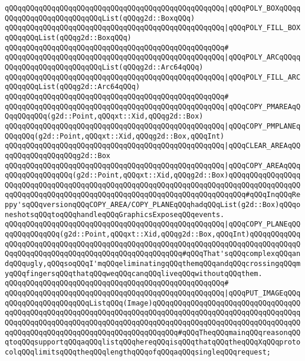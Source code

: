\verb|qQQqqQQqqQQqqQQqqQQqqQQqqQQqqQQqqQQqqQQqqQQqqQQqqQQq|\verb#|qQQqPOLY_BOXqQQqqQQqqQQqqQQqqQQqqQQqqQQqList(qQQqg2d::BoxqQQq)#\newline
\verb|qQQqqQQqqQQqqQQqqQQqqQQqqQQqqQQqqQQqqQQqqQQqqQQqqQQq|\verb#|qQQqPOLY_FILL_BOXqQQqqQQqList(qQQqg2d::BoxqQQq)#\newline
\verb|qQQqqQQqqQQqqQQqqQQqqQQqqQQqqQQqqQQqqQQqqQQqqQQqqQQq#|\newline
\verb|qQQqqQQqqQQqqQQqqQQqqQQqqQQqqQQqqQQqqQQqqQQqqQQqqQQq|\verb#|qQQqPOLY_ARCqQQqqQQqqQQqqQQqqQQqqQQqqQQqList(qQQqg2d::Arc64qQQq)#\newline
\verb|qQQqqQQqqQQqqQQqqQQqqQQqqQQqqQQqqQQqqQQqqQQqqQQqqQQq|\verb#|qQQqPOLY_FILL_ARCqQQqqQQqList(qQQqg2d::Arc64qQQq)#\newline
\verb|qQQqqQQqqQQqqQQqqQQqqQQqqQQqqQQqqQQqqQQqqQQqqQQqqQQq#|\newline
\verb|qQQqqQQqqQQqqQQqqQQqqQQqqQQqqQQqqQQqqQQqqQQqqQQqqQQq|\verb#|qQQqCOPY_PMAREAqQQqqQQqqQQq(g2d::Point,qQQqxt::Xid,qQQqg2d::Box)#\newline
\verb|qQQqqQQqqQQqqQQqqQQqqQQqqQQqqQQqqQQqqQQqqQQqqQQqqQQq|\verb#|qQQqCOPY_PMPLANEqQQqqQQq(g2d::Point,qQQqxt::Xid,qQQqg2d::Box,qQQqInt)#\newline
\verb|qQQqqQQqqQQqqQQqqQQqqQQqqQQqqQQqqQQqqQQqqQQqqQQqqQQq|\verb#|qQQqCLEAR_AREAqQQqqQQqqQQqqQQqqQQqg2d::Box#\newline
\verb|qQQqqQQqqQQqqQQqqQQqqQQqqQQqqQQqqQQqqQQqqQQqqQQqqQQq|\verb#|qQQqCOPY_AREAqQQqqQQqqQQqqQQqqQQq(g2d::Point,qQQqxt::Xid,qQQqg2d::Box)qQQqqQQqqQQqqQQqqQQqqQQqqQQqqQQqqQQqqQQqqQQqqQQqqQQqqQQqqQQqqQQqqQQqqQQqqQQqqQQqqQQqqQQqqQQqqQQqqQQqqQQqqQQqqQQqqQQqqQQqqQQqqQQqqQQqqQQqqQQqqQQq#\verb|#qQQqInqQQqReppy'sqQQqversionqQQqCOPY_AREA/COPY_PLANEqQQqhadqQQqList(g2d::Box)qQQqoneshotsqQQqtoqQQqhandleqQQqGraphicsExposeqQQqevents.|\newline
\verb|qQQqqQQqqQQqqQQqqQQqqQQqqQQqqQQqqQQqqQQqqQQqqQQqqQQq|\verb#|qQQqCOPY_PLANEqQQqqQQqqQQqqQQq(g2d::Point,qQQqxt::Xid,qQQqg2d::Box,qQQqInt)qQQqqQQqqQQqqQQqqQQqqQQqqQQqqQQqqQQqqQQqqQQqqQQqqQQqqQQqqQQqqQQqqQQqqQQqqQQqqQQqqQQqqQQqqQQqqQQqqQQqqQQqqQQqqQQqqQQqqQQqqQQq#\verb|#qQQqThat'sqQQqcomplexqQQqandqQQqugly,qQQqsoqQQqI'mqQQqeliminatingqQQqthemqQQqandqQQqcrossingqQQqmyqQQqfingersqQQqthatqQQqweqQQqcanqQQqliveqQQqwithoutqQQqthem.|\newline
\verb|qQQqqQQqqQQqqQQqqQQqqQQqqQQqqQQqqQQqqQQqqQQqqQQqqQQq#|\newline
\verb|qQQqqQQqqQQqqQQqqQQqqQQqqQQqqQQqqQQqqQQqqQQqqQQqqQQq|\verb#|qQQqPUT_IMAGEqQQqqQQqqQQqqQQqqQQqqQQqListqQQq(Image)qQQqqQQqqQQqqQQqqQQqqQQqqQQqqQQqqQQqqQQqqQQqqQQqqQQqqQQqqQQqqQQqqQQqqQQqqQQqqQQqqQQqqQQqqQQqqQQqqQQqqQQqqQQqqQQqqQQqqQQqqQQqqQQqqQQqqQQqqQQqqQQqqQQqqQQqqQQqqQQqqQQqqQQqqQQqqQQqqQQqqQQqqQQqqQQqqQQqqQQqqQQqqQQqqQQqqQQq#\verb|#qQQqTheqQQqmainqQQqreasonqQQqtoqQQqsupportqQQqaqQQqlistqQQqhereqQQqisqQQqthatqQQqtheqQQqXqQQqprotocolqQQqlimitsqQQqtheqQQqlengthqQQqofqQQqaqQQqsingleqQQqrequest;|\newline
